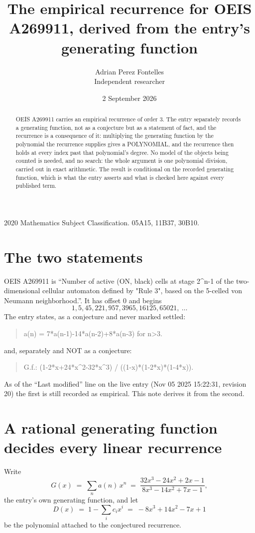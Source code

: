 \documentclass[11pt,a4paper]{article}
\title{The empirical recurrence for OEIS A269911, derived from the entry's generating function}
\author{Adrian Perez Fontelles\\ \small Independent researcher}
\date{2 September 2026}
\theoremstyle{plain}
\theoremstyle{definition}
\begin{document}
\maketitle

\begin{abstract}
OEIS A269911 carries an empirical recurrence of order $3$. The entry separately records a
generating function, not as a conjecture but as a statement of fact, and the recurrence is a
consequence of it: multiplying the generating function by the polynomial the recurrence
supplies gives a POLYNOMIAL, and the recurrence then holds at every index past that
polynomial's degree. No model of the objects being counted is needed, and no search: the
whole argument is one polynomial division, carried out in exact arithmetic. The result is
conditional on the recorded generating function, which is what the entry asserts and what is
checked here against every published term.
\end{abstract}

\noindent\small 2020 Mathematics Subject Classification. 05A15, 11B37, 30B10.\normalsize

\section{The two statements}

OEIS A269911 is ``Number of active (ON, black) cells at stage 2\^{}n-1 of the two-dimensional cellular automaton defined by "Rule 3", based on the 5-celled von Neumann neighborhood.''. It has offset $0$ and begins
\[
1, 5, 45, 221, 957, 3965, 16125, 65021,\ \dots
\]
The entry states, as a conjecture and never marked settled:
\begin{quote}
a(n) = 7*a(n-1)-14*a(n-2)+8*a(n-3) for n>3.
\end{quote}
and, separately and NOT as a conjecture:
\begin{quote}
G.f.: (1-2*x+24*x\^{}2-32*x\^{}3) / ((1-x)*(1-2*x)*(1-4*x)).
\end{quote}
As of the ``Last modified'' line on the live entry (Nov 05 2025 15:22:31, revision 20) the first is still
recorded as empirical. This note derives it from the second.

\section{A rational generating function decides every linear recurrence}

Write
\[
G(x)\;=\;\sum_{n}a(n)\,x^{n}\;=\;\frac{32 x^{3} - 24 x^{2} + 2 x - 1}{8 x^{3} - 14 x^{2} + 7 x - 1},
\]
the entry's own generating function, and let
\[
D(x)\;=\;1-\sum_i c_i x^{i}\;=\;- 8 x^{3} + 14 x^{2} - 7 x + 1
\]
be the polynomial attached to the conjectured recurrence.
\end{document}
